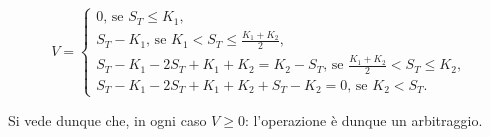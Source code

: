 \begin{equation}
	V =
	\begin{cases}
		0\text{, se }S_T \leq K_1,\\
		S_T - K_1\text{, se }K_1 < S_T \leq \frac{K_1 + K_2}{2},\\
		S_T - K_1 - 2S_T + K_1 + K_2 = K_2 - S_T\text{, se }\frac{K_1 + K_2}{2} < S_T \leq K_2,\\
		S_T - K_1 - 2S_T + K_1 + K_2 + S_T - K_2 = 0\text{, se } K_2 < S_T.
	\end{cases}
\end{equation}
\par Si vede dunque che, in ogni caso $V \geq 0$: l'operazione \`e dunque un arbitraggio.\EndProof
